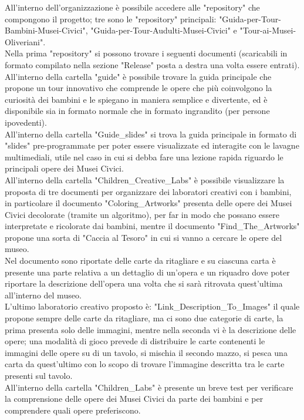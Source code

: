 \documentclass[hidelinks,12pt,a4paper]{article}
\begin{document}
\begin{flushleft}
		All'interno dell'organizzazione è possibile accedere alle "repository" che compongono il progetto; tre sono le "repository" principali: "Guida-per-Tour-Bambini-Musei-Civici", "Guida-per-Tour-Audulti-Musei-Civici" e "Tour-ai-Musei-Oliveriani".\\
		\bigskip
		Nella prima "repository" si possono trovare i seguenti documenti (scaricabili in formato compilato nella sezione "Release" posta a destra una volta essere entrati).\\
		All'interno della cartella "guide" è possibile trovare la guida principale che propone un tour innovativo che comprende le opere che più coinvolgono la curiosità dei bambini e le spiegano in maniera semplice e divertente, ed è disponibile sia in formato normale che in formato ingrandito (per persone ipovedenti).\\
		All'interno della cartella "Guide\_slides" si trova la guida principale in formato di "slides" pre-programmate per poter essere visualizzate ed interagite con le lavagne multimediali, utile nel caso in cui si debba fare una lezione rapida riguardo le principali opere dei Musei Civici.\\ All'interno della cartella "Children\_Creative\_Labs" è possibile visualizzare la proposta di tre documenti per organizzare dei laboratori creativi con i bambini, in particolare il documento "Coloring\_Artworks" presenta delle opere dei Musei Civici decolorate (tramite un algoritmo), per far in modo che possano essere interpretate e ricolorate dai bambini, mentre il documento "Find\_The\_Artworks" propone una sorta di "Caccia al Tesoro" in cui si vanno a cercare le opere del museo.\\
		Nel documento sono riportate delle carte da ritagliare e su ciascuna carta è presente una parte relativa a un dettaglio di un'opera e un riquadro dove poter riportare la descrizione dell'opera una volta che si sarà ritrovata quest'ultima all'interno del museo.\\
		L'ultimo laboratorio creativo proposto è: "Link\_Description\_To\_Images" il quale propone sempre delle carte da ritagliare, ma ci sono due categorie di carte, la prima presenta solo delle immagini, mentre nella seconda vi è la descrizione delle opere; una modalità di gioco prevede di distribuire le carte contenenti le immagini delle opere su di un tavolo, si mischia il secondo mazzo, si pesca una carta da quest'ultimo con lo scopo di trovare l'immagine descritta tra le carte presenti sul tavolo.\\
		All'interno della cartella "Children\_Labs" è presente un breve test per verificare la comprensione delle opere dei Musei Civici da parte dei bambini e per comprendere quali opere preferiscono.\\

\end{flushleft}
\end{document}
